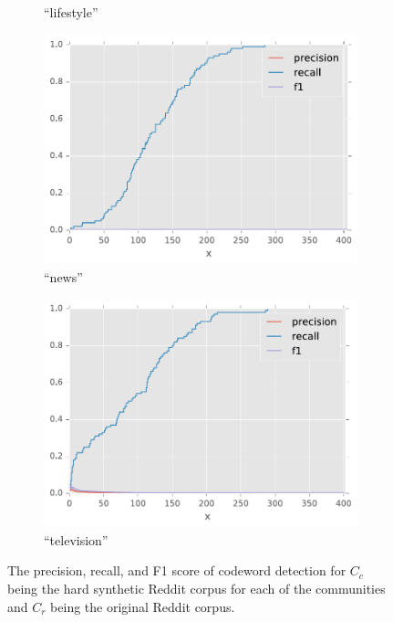 \begin{figure}[H]
\begin{subfigure}[t]{.4\textwidth}
\caption{``lifestyle''}
\label{fig-reddit-lifestyle-f1}
\end{subfigure}
\begin{subfigure}[t]{.4\textwidth}
\centering\includegraphics[]{figures/reddit-news-f1.pdf}
\caption{``news''}
\label{fig-reddit-news-f1}
\end{subfigure}
\begin{subfigure}[t]{.4\textwidth}
\centering\includegraphics[]{figures/reddit-television-f1.pdf}
\caption{``television''}
\label{fig-reddit-television-f1}
\end{subfigure}
\caption{The precision, recall, and F1 score of codeword detection for $C_c$ being the hard synthetic Reddit corpus for each of the communities and $C_r$ being the original Reddit corpus.}
\label{fig-reddit-community-f1}
\end{figure}

